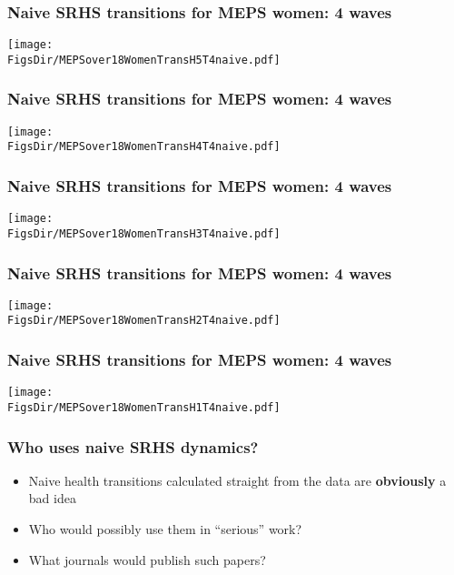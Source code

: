 \documentclass[aspectratio=169]{beamer}
\newcommand{\FigsDir}{../Figures}
\begin{document}
\begin{frame}\frametitle{Naive SRHS transitions for MEPS women: 4 waves}
\begin{center}
\texttt{[image: \\FigsDir/MEPSover18WomenTransH5T4naive.pdf]}
\end{center}
\end{frame}

\begin{frame}\frametitle{Naive SRHS transitions for MEPS women: 4 waves}
\begin{center}
\texttt{[image: \\FigsDir/MEPSover18WomenTransH4T4naive.pdf]}
\end{center}
\end{frame}

\begin{frame}\frametitle{Naive SRHS transitions for MEPS women: 4 waves}
\begin{center}
\texttt{[image: \\FigsDir/MEPSover18WomenTransH3T4naive.pdf]}
\end{center}
\end{frame}

\begin{frame}\frametitle{Naive SRHS transitions for MEPS women: 4 waves}
\begin{center}
\texttt{[image: \\FigsDir/MEPSover18WomenTransH2T4naive.pdf]}
\end{center}
\end{frame}

\begin{frame}\frametitle{Naive SRHS transitions for MEPS women: 4 waves}
\begin{center}
\texttt{[image: \\FigsDir/MEPSover18WomenTransH1T4naive.pdf]}
\end{center}
\end{frame}


\begin{frame}\frametitle{Who uses naive SRHS dynamics?}

\begin{itemize}
	\item <1->Naive health transitions calculated straight from the data are \textbf{obviously} a bad idea
	
	\item <2->Who would possibly use them in ``serious'' work?
	
	\item <2->What journals would publish such papers?
\end{itemize}
\end{frame}
\end{document}
